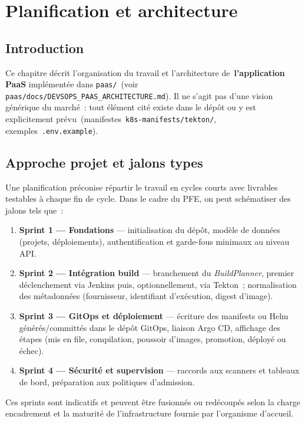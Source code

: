 \chapter{Planification et architecture}
\label{ch:archi}

\section{Introduction}

Ce chapitre décrit l'organisation du travail et l'architecture de~\textbf{l'application PaaS} implémentée dans \texttt{paas/}~(voir \texttt{paas/docs/DEVSOPS\_PAAS\_ARCHITECTURE.md}). Il ne s'agit pas d'une vision générique du marché~: tout élément cité existe dans le dépôt ou y est explicitement prévu~(manifestes~\texttt{k8s-manifests/tekton/}, exemples~\texttt{.env.example}).

\section{Approche projet et jalons types}

Une planification préconise répartir le travail en cycles courts avec livrables testables à chaque fin de cycle. Dans le cadre du PFE, on peut schématiser des jalons tels que~:

\begin{enumerate}[leftmargin=*]
\item \textbf{Sprint 1 — Fondations} — initialisation du dépôt, modèle de données (projets, déploiements), authentification et garde-fous minimaux au niveau API.
\item \textbf{Sprint 2 — Intégration build} — branchement du \emph{BuildPlanner}, premier déclenchement via Jenkins puis, optionnellement, via Tekton~; normalisation des métadonnées (fournisseur, identifiant d'exécution, digest d'image).
\item \textbf{Sprint 3 — GitOps et déploiement} — écriture des manifests ou Helm générés/committés dans le dépôt GitOps, liaison Argo CD, affichage des étapes (mis en file, compilation, poussoir d'images, promotion, déployé ou échec).
\item \textbf{Sprint 4 — Sécurité et supervision} — raccords aux scanners et tableaux de bord, préparation aux politiques d'admission.
\end{enumerate}

Ces sprints sont indicatifs et peuvent être fusionnés ou redécoupés selon la charge encadrement et la maturité de l'infrastructure fournie par l'organisme d'accueil.


